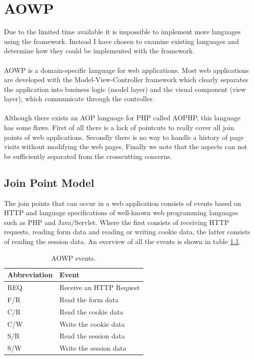 \documentclass[a4paper]{report}
\begin{document}
\chapter{AOWP}
\label{chap:AOWP}
Due to the limited time available it is impossible to implement more languages using the framework. Instead I have chosen to examine existing languages and determine how they could be implemented with the framework.\\
\\
AOWP \cite{hokamura_aspect-oriented_2008} is a domain-specific language for web applications. Most web applications are developed with the Model-View-Controller framework which clearly separates the application into business logic (model layer) and the visual component (view layer), which communicate through the controller.\\
\\
Although there exists an AOP language for PHP called AOPHP, this language has some flaws. First of all there is a lack of pointcuts to really cover all join points of web applications. Secondly there is no way to handle a history of page visits without modifying the web pages. Finally we note that the aspects can not be sufficiently separated from the crosscutting concerns.

\section{Join Point Model}
The join points that can occur in a web application consists of events based on HTTP and language specifications of well-known web programming languages such as PHP and Java/Servlet. Where the first consists of receiving HTTP requests, reading form data and reading or writing cookie data, the latter consists of reading the session data. An overview of all the events is shown in table \ref{tab:AOWP_Events}.
\begin{table}
\centering
\begin{tabular}{l|l}
\hline
Abbreviation & Event\\
\hline
\hline
REQ & Receive an HTTP Request\\
\hline
F/R & Read the form data\\
\hline
C/R & Read the cookie data\\
\hline
C/W & Write the cookie data\\
\hline
S/R & Read the session data\\
\hline
S/W & Write the session data\\
\hline
\end{tabular}
\caption{AOWP events.}
\label{tab:AOWP_Events}
\end{table}
\end{document}
